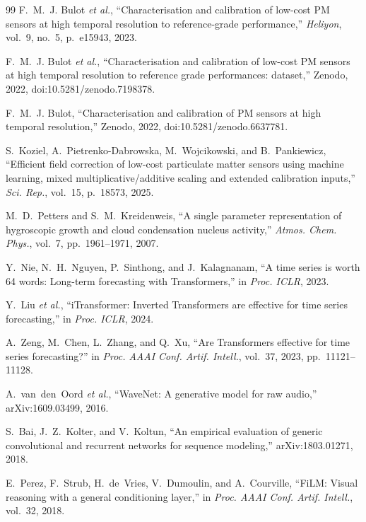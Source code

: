 \documentclass[journal]{IEEEtran}
\begin{document}
\begin{thebibliography}{99}
 F.~M.~J. Bulot \emph{et al.}, ``Characterisation and calibration of low-cost PM sensors at high
temporal resolution to reference-grade performance,'' \emph{Heliyon}, vol.~9, no.~5, p.~e15943, 2023.

 F.~M.~J. Bulot \emph{et al.}, ``Characterisation and calibration of low-cost PM sensors at high
temporal resolution to reference grade performances: dataset,'' Zenodo, 2022, doi:10.5281/zenodo.7198378.

 F.~M.~J. Bulot, ``Characterisation and calibration of PM sensors at high temporal
resolution,'' Zenodo, 2022, doi:10.5281/zenodo.6637781.

 S.~Koziel, A.~Pietrenko-Dabrowska, M.~Wojcikowski, and B.~Pankiewicz, ``Efficient field
correction of low-cost particulate matter sensors using machine learning, mixed multiplicative/additive scaling and
extended calibration inputs,'' \emph{Sci. Rep.}, vol.~15, p.~18573, 2025.

 M.~D.~Petters and S.~M.~Kreidenweis, ``A single parameter representation of hygroscopic growth
and cloud condensation nucleus activity,'' \emph{Atmos. Chem. Phys.}, vol.~7, pp.~1961--1971, 2007.

 Y.~Nie, N.~H.~Nguyen, P.~Sinthong, and J.~Kalagnanam, ``A time series is worth 64 words: Long-term
forecasting with Transformers,'' in \emph{Proc. ICLR}, 2023.

 Y.~Liu \emph{et al.}, ``iTransformer: Inverted Transformers are effective for time series
forecasting,'' in \emph{Proc. ICLR}, 2024.

 A.~Zeng, M.~Chen, L.~Zhang, and Q.~Xu, ``Are Transformers effective for time series forecasting?''
in \emph{Proc. AAAI Conf. Artif. Intell.}, vol.~37, 2023, pp.~11121--11128.

 A.~van~den~Oord \emph{et al.}, ``WaveNet: A generative model for raw audio,'' arXiv:1609.03499,
2016.

 S.~Bai, J.~Z.~Kolter, and V.~Koltun, ``An empirical evaluation of generic convolutional and
recurrent networks for sequence modeling,'' arXiv:1803.01271, 2018.

 E.~Perez, F.~Strub, H.~de~Vries, V.~Dumoulin, and A.~Courville, ``FiLM: Visual reasoning with a
general conditioning layer,'' in \emph{Proc. AAAI Conf. Artif. Intell.}, vol.~32, 2018.


\end{thebibliography}
\end{document}
